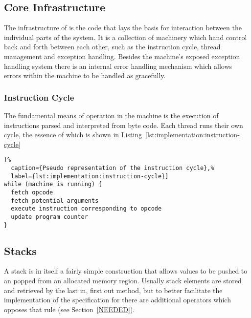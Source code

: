 
\subsection{Core Infrastructure}

The infrastructure of \thename{} is the code that lays the basis for interaction
between the individual parts of the system. It is a collection of machinery
which hand control back and forth between each other, such as the instruction
cycle, thread management and exception handling. Besides the machine's exposed
exception handling system there is an internal error handling mechanism which
allows errors within the machine to be handled as gracefully.

\subsubsection{Instruction Cycle}

The fundamental means of operation in the machine is the execution of
instructions parsed and interpreted from byte code. Each thread runs their own
cycle, the essence of which is shown in
Listing~\ref{lst:implementation:instruction-cycle}

\begin{lstlisting}[%
  caption={Pseudo representation of the instruction cycle},%
  label={lst:implementation:instruction-cycle}]
while (machine is running) {
  fetch opcode
  fetch potential arguments
  execute instruction corresponding to opcode
  update program counter
}
\end{lstlisting}




\subsection{Stacks}

A stack is in itself a fairly simple construction that allows values to be
pushed to an popped from an allocated memory region. Usually stack elements are
stored and retrieved by the last in, first out method, but to better facilitate
the implementation of the specification for \thename{} there are additional
operators which opposes that rule (see Section~\ref{NEEDED}).

